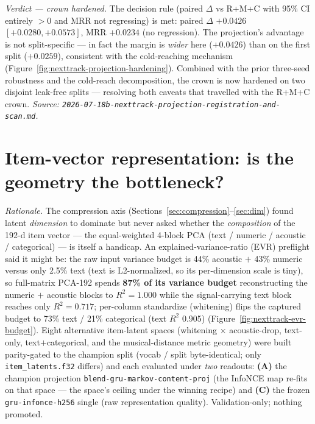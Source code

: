 \documentclass[11pt]{article}
\begin{document}
\emph{Verdict --- crown hardened.} The decision rule (paired $\Delta$ vs R+M+C
with 95\% CI entirely $>0$ and MRR not regressing) is met: paired $\Delta$
\textbf{$+\num{0.0426}$ $[+0.0280, +0.0573]$}, MRR $+\num{0.0234}$ (no regression).
The projection's advantage is not split-specific --- in fact the margin is
\emph{wider} here ($+\num{0.0426}$) than on the first split ($+\num{0.0259}$),
consistent with the cold-reaching mechanism
(Figure~\ref{fig:nexttrack-projection-hardening}). Combined with the prior
three-seed robustness and the cold-reach decomposition, the crown is now hardened
on two disjoint leak-free splits --- resolving both caveats that travelled with the
R+M+C crown.
\emph{Source: \texttt{2026-07-18b-nexttrack-projection-registration-and-scan.md}.}

\section{Item-vector representation: is the geometry the bottleneck?}
\label{sec:representation}
\emph{Rationale.} The compression axis (Sections~\ref{sec:compression}--\ref{sec:dim})
found latent \emph{dimension} to dominate but never asked whether the
\emph{composition} of the 192-d item vector --- the equal-weighted 4-block PCA
(text / numeric / acoustic / categorical) --- is itself a handicap. An
explained-variance-ratio (EVR) preflight said it might be: the raw input variance
budget is 44\% acoustic $+$ 43\% numeric versus only 2.5\% text (text is
L2-normalized, so its per-dimension scale is tiny), so full-matrix PCA-192 spends
\textbf{87\% of its variance budget} reconstructing the numeric $+$ acoustic
blocks to $R^2 = \num{1.000}$ while the signal-carrying text block reaches only
$R^2 = \num{0.717}$; per-column standardize (whitening) flips the captured budget
to 73\% text / 21\% categorical (text $R^2$ \num{0.905})
(Figure~\ref{fig:nexttrack-evr-budget}). Eight alternative item-latent spaces
(whitening $\times$ acoustic-drop, text-only, text$+$categorical, and the
musical-distance metric geometry) were built parity-gated to the champion split
(vocab / split byte-identical; only \texttt{item\_latents.f32} differs) and each
evaluated under \emph{two} readouts: \textbf{(A)} the champion projection
\texttt{blend-gru-markov-content-proj} (the InfoNCE map re-fits on that space ---
the space's ceiling under the winning recipe) and \textbf{(C)} the frozen
\texttt{gru-infonce-h256} single (raw representation quality). Validation-only;
nothing promoted.
\end{document}
